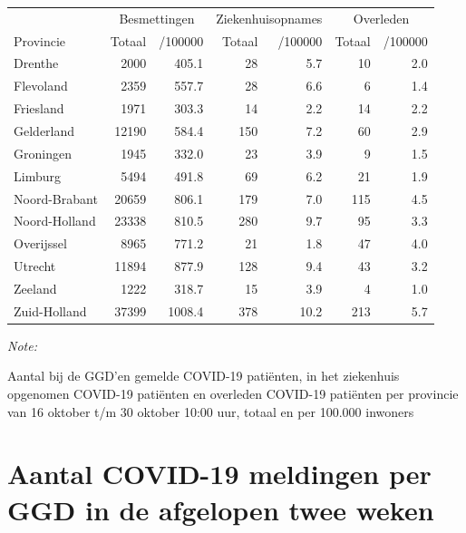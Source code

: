\documentclass[
  english,
  man,floatsintext]{apa6}
\begin{document}
\begin{table}[H]
\centering
\begin{threeparttable}
\begin{tabular}{lrrrrrr}
\toprule
\multicolumn{1}{c}{ } & \multicolumn{2}{c}{Besmettingen} & \multicolumn{2}{c}{Ziekenhuisopnames} & \multicolumn{2}{c}{Overleden} \\
\cmidrule(l{3pt}r{3pt}){2-3} \cmidrule(l{3pt}r{3pt}){4-5} \cmidrule(l{3pt}r{3pt}){6-7}
Provincie & Totaal & /100000 & Totaal & /100000 & Totaal & /100000\\
\midrule
Drenthe & 2000 & 405.1 & 28 & 5.7 & 10 & 2.0\\
Flevoland & 2359 & 557.7 & 28 & 6.6 & 6 & 1.4\\
Friesland & 1971 & 303.3 & 14 & 2.2 & 14 & 2.2\\
Gelderland & 12190 & 584.4 & 150 & 7.2 & 60 & 2.9\\
Groningen & 1945 & 332.0 & 23 & 3.9 & 9 & 1.5\\
Limburg & 5494 & 491.8 & 69 & 6.2 & 21 & 1.9\\
Noord-Brabant & 20659 & 806.1 & 179 & 7.0 & 115 & 4.5\\
Noord-Holland & 23338 & 810.5 & 280 & 9.7 & 95 & 3.3\\
Overijssel & 8965 & 771.2 & 21 & 1.8 & 47 & 4.0\\
Utrecht & 11894 & 877.9 & 128 & 9.4 & 43 & 3.2\\
Zeeland & 1222 & 318.7 & 15 & 3.9 & 4 & 1.0\\
Zuid-Holland & 37399 & 1008.4 & 378 & 10.2 & 213 & 5.7\\
\bottomrule
\end{tabular}
\begin{tablenotes}
\item \textit{Note: } 
\item Aantal bij de GGD’en gemelde COVID-19 patiënten, in het ziekenhuis opgenomen COVID-19 patiënten en overleden COVID-19 patiënten per provincie van 16 oktober t/m 30 oktober 10:00 uur, totaal en per 100.000 inwoners
\end{tablenotes}
\end{threeparttable}
\end{table}

\newpage

\hypertarget{aantal-covid-19-meldingen-per-ggd-in-de-afgelopen-twee-weken}{%
\section{Aantal COVID-19 meldingen per GGD in de afgelopen twee weken}\label{aantal-covid-19-meldingen-per-ggd-in-de-afgelopen-twee-weken}}
\end{document}

